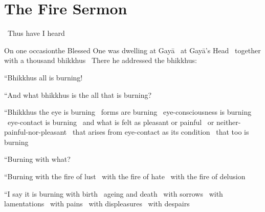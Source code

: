 
\section{The Fire Sermon}
\label{fire-sermon}

\begin{leader-english}
  \anglebracketleft\ \hspace{-0.5mm}Thus have I heard \hspace{-0.5mm}\anglebracketright\
\end{leader-english}

\begin{english-only-hang}
  On one occasion\makeatletter\hyperlink{endnote113-appendix}\makeatother\thinspace the Blessed One was dwelling at Gayā \breathmark\ at Gayā's Head \breathmark\ together with a thousand bhikkhus \breathmark\ There he addressed the bhikkhus:
\end{english-only-hang}

\begin{english-only-hang}
  ``Bhikkhus all is burning!
\end{english-only-hang}

\begin{english-only-hang}
  ``And what bhikkhus is the all that is burning?
\end{english-only-hang}

\begin{english-only-hang}
  ``Bhikkhus the eye is burning \breathmark\ forms are burning \breathmark\ eye-consciousness is burning \breathmark\ eye-contact is burning \breathmark\ and what is felt as pleasant or painful \breathmark\ or neither-painful-nor-pleasant \breathmark\ that arises from eye-contact as its condition \breathmark\ that too is burning
\end{english-only-hang}
\begin{english-only-hangtogether}
  ``Burning with what?
\end{english-only-hangtogether}
\begin{english-only-hangtogether}
  ``Burning with the fire of lust \breathmark\ with the fire of hate \breathmark\ with the fire of delusion
\end{english-only-hangtogether}
\begin{english-only-hangtogether}
  ``I say it is burning with birth \breathmark\ ageing and death \breathmark\ with sorrows \breathmark\ with lamentations \breathmark\ with pains \breathmark\ with displeasures \breathmark\ with despairs
\end{english-only-hangtogether}


